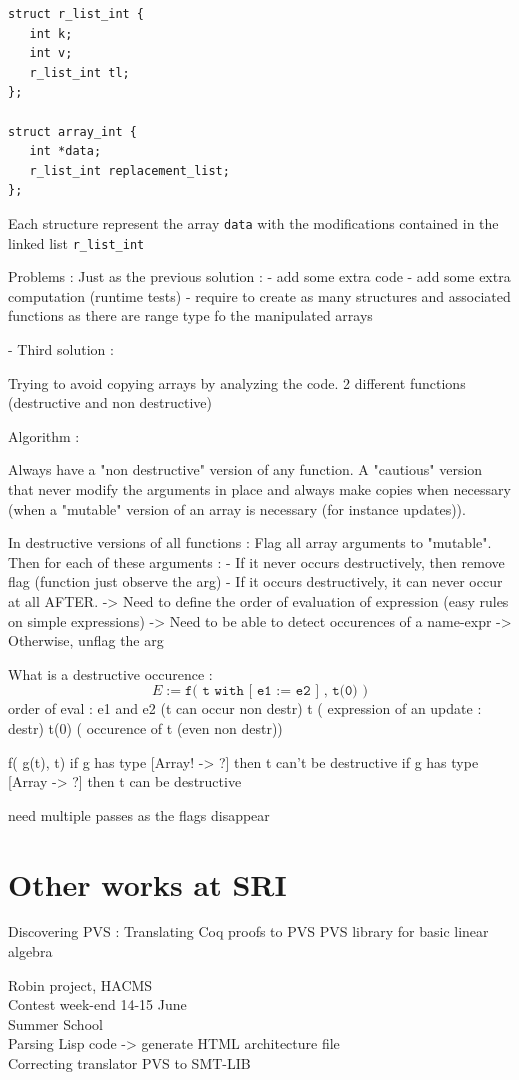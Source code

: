 \documentclass[12pt,a4paper,titlepage]{article}
\newcommand{\codeline}[1]{\texttt{#1}}
\begin{document}
\begin{lstlisting}
struct r_list_int {
   int k;
   int v;
   r_list_int tl;
};

struct array_int {
   int *data;
   r_list_int replacement_list;
};
\end{lstlisting}

Each structure represent the array \codeline{data} with the modifications contained in the linked list \codeline{r\_list\_int}

Problems : Just as the previous solution :
- add some extra code
- add some extra computation (runtime tests)
- require to create as many structures and associated functions as there are range type fo the manipulated arrays


- Third solution :

Trying to avoid copying arrays by analyzing the code.
2 different functions (destructive and non destructive)


Algorithm :

Always have a "non destructive" version of any function. A "cautious" version that never modify the arguments in place and always make copies when necessary (when a "mutable" version of an array is necessary (for instance updates)).

In destructive versions of all functions :
Flag all array arguments to "mutable".
Then for each of these arguments :
  - If it never occurs destructively, then remove flag
          (function just observe the arg)
  - If it occurs destructively, it can never occur at all AFTER.
  -> Need to define the order of evaluation of expression
      (easy rules on simple expressions)
  -> Need to be able to detect occurences of a name-expr
  -> Otherwise, unflag the arg

What is a destructive occurence :
$$ E :=  \codeline{f(  t with [ e1 := e2 ] , t(0) )} $$
order of eval :
e1 and e2  (t can occur non destr)
t          ( expression of an update : destr)
t(0)       ( occurence of t (even non destr))

f( g(t), t)
if g has type [Array! -> ?] then t can't be destructive
if g has type [Array  -> ?] then t can be destructive

need multiple passes as the flags disappear









\section{Other works at SRI}

Discovering PVS :
Translating Coq proofs to PVS
PVS library for basic linear algebra

Robin project, HACMS \\
Contest week-end 14-15 June \\
Summer School \\
Parsing Lisp code -> generate HTML architecture file\\
Correcting translator PVS to SMT-LIB






\end{document}
